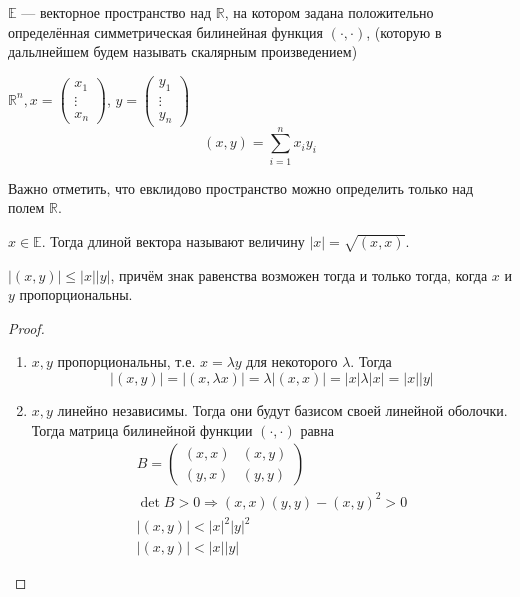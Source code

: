 \begin{Def}
	$\mathbb{E} $ --- векторное пространство над $\mathbb{R}$, на котором задана положительно определённая симметрическая билинейная функция $(\cdot, \cdot)$, (которую в дальлнейшем будем называть скалярным произведением)
\end{Def}
\begin{Examples}
	$\mathbb{R}^n, x = \begin{pmatrix}x_1\\ \vdots\\ x_n\end{pmatrix}$, $y = \begin{pmatrix}y_1\\ \vdots\\ y_n\end{pmatrix}$
	\[
		(x,y) = \sum\limits_{i = 1}^n x_iy_i
	\]
\end{Examples}
\begin{Comment}
	Важно отметить, что евклидово пространство можно определить только над полем $\mathbb{R}$.
\end{Comment}
\begin{Def}
	$x\in \mathbb{E}$. Тогда длиной вектора называют величину $|x| = \sqrt{(x,x)}$.
\end{Def}
\begin{Suggestion}
	$|(x,y)| \leqslant |x||y|$, причём знак равенства возможен тогда и только тогда, когда $x$ и $y$ пропорциональны.
\end{Suggestion}
\begin{proof}
	\ \\
	\begin{enumerate}
		\item $x,y$ пропорциональны, т.е. $x = \lambda y$ для некоторого $\lambda$. Тогда
		\[
			|(x,y)| = |(x,\lambda x)| = \lambda|(x,x)| = |x|\lambda|x| = |x||y|
		\]
		\item $x,y$ линейно независимы. Тогда они будут базисом своей линейной оболочки. Тогда матрица билинейной функции $(\cdot, \cdot)$ равна
		\begin{gather*}
		B = \begin{pmatrix}
			(x,x)& (x,y)\\
			(y,x)& (y,y)
		\end{pmatrix}\\
		\det B >0 \Rightarrow (x,x)(y,y) - (x,y)^2 > 0\\
		|(x,y)| < |x|^2|y|^2\\
		|(x,y)| < |x||y|
		\end{gather*}
		
	\end{enumerate}
\end{proof}
